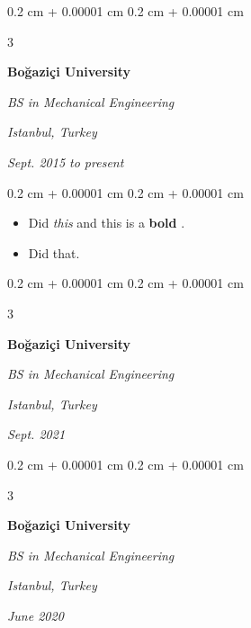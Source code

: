 \documentclass[10pt, letterpaper]{article}
\newenvironment{highlights}{
    \begin{itemize}[
        topsep=0.10 cm,
        parsep=0.10 cm,
        partopsep=0pt,
        itemsep=0pt,
        leftmargin=0.4 cm + 10pt + 0.6 cm
    ]
}{
    \end{itemize}
} %
\newenvironment{onecolentry}{
    \begin{adjustwidth}{
        0.2 cm + 0.00001 cm
    }{
        0.2 cm + 0.00001 cm
    }
}{
    \end{adjustwidth}
} %
\newenvironment{threecolentry}[3][]{
    \onecolentry
    \def\thirdColumn{#3}
    \setcolumnwidth{0.6 cm, \fill, 4.5 cm}
    \begin{paracol}{3}
    #2 \switchcolumn
}{
    \switchcolumn \raggedleft \thirdColumn
    \end{paracol}
    \endonecolentry
} %
\let\hrefWithoutArrow\href
\renewcommand{\href}[2]{\hrefWithoutArrow{#1}{\mbox{\ifthenelse{\equal{#2}{}}{ }{#2 }\raisebox{.15ex}{\footnotesize \faExternalLink*}}}}
\begin{document}
        \vspace{0.2 cm-3px}

        \begin{threecolentry}{
            \vspace*{\fill}
            \textbullet
            \vspace*{3px}
            \vspace*{\fill}
        }{
        \textit{Istanbul, Turkey}    
            
        \textit{Sept. 2015 to present}}
            \textbf{Boğaziçi University}

            \textit{BS in Mechanical Engineering}
        \end{threecolentry}

        \vspace{0.10 cm-3px}
        \begin{onecolentry}
            \begin{highlights}
                \item Did \textit{this} and this is a \textbf{bold} \href{https://example.com}{link}.
                \item Did that.
            \end{highlights}
        \end{onecolentry}


        \vspace{0.2 cm-3px}

        \begin{threecolentry}{
            \vspace*{\fill}
            \textbullet
            \vspace*{3px}
            \vspace*{\fill}
        }{
        \textit{Istanbul, Turkey}    
            
        \textit{Sept. 2021}}
            \textbf{Boğaziçi University}

            \textit{BS in Mechanical Engineering}
        \end{threecolentry}



        \vspace{0.2 cm-3px}

        \begin{threecolentry}{
            \vspace*{\fill}
            \textbullet
            \vspace*{3px}
            \vspace*{\fill}
        }{
        \textit{Istanbul, Turkey}    
            
        \textit{June 2020}}
            \textbf{Boğaziçi University}

            \textit{BS in Mechanical Engineering}
        \end{threecolentry}
\end{document}
